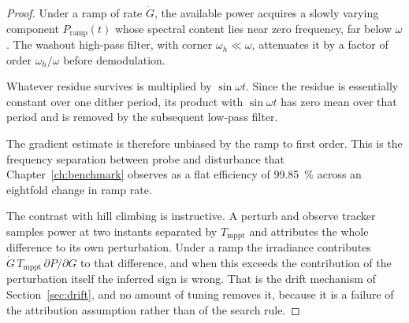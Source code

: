 \begin{proof}
Under a ramp of rate $\dot G$, the available power acquires a slowly varying
component $P_{\mathrm{ramp}}(t)$ whose spectral content lies near zero frequency,
far below $\omega$. The washout high-pass filter, with corner
$\omega_h \ll \omega$, attenuates it by a factor of order $\omega_h/\omega$
before demodulation.

Whatever residue survives is multiplied by $\sin\omega t$. Since the residue is
essentially constant over one dither period, its product with $\sin\omega t$ has
zero mean over that period and is removed by the subsequent low-pass filter.

The gradient estimate is therefore unbiased by the ramp to first order. This is
the frequency separation between probe and disturbance that
Chapter~\ref{ch:benchmark} observes as a flat efficiency of
\SI{99.85}{\percent} across an eightfold change in ramp rate.

The contrast with hill climbing is instructive. A perturb and observe tracker
samples power at two instants separated by $T_{\mathrm{mppt}}$ and attributes the
whole difference to its own perturbation. Under a ramp the irradiance
contributes $\dot G\,T_{\mathrm{mppt}}\,\partial P/\partial G$ to that
difference, and when this exceeds the contribution of the perturbation itself the
inferred sign is wrong. That is the drift mechanism of
Section~\ref{sec:drift}, and no amount of tuning removes it, because it is a
failure of the attribution assumption rather than of the search rule.
\end{proof}
